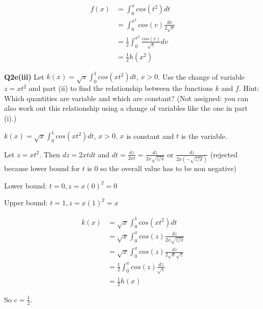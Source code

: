 \documentclass[9pt]{article}
\begin{document}
\begin{align*}
  f(x) &= \int_0^x cos(t^2) dt \\
  &= \int_0^{x^2} cos(v) \frac{dv}{2\sqrt{v}} \\
  &= \frac{1}{2} \int_0^{x^2} \frac{cos(v)}{\sqrt{v}} dv \\
  &= \frac{1}{2} h(x^2)
\end{align*}


\begin{tcolorbox}
  \textbf{Q2e(iii)} Let $k(x) = \sqrt{x} \int_0^1 cos(xt^2)dt$, $x > 0$. Use the change of variable $z = xt^2$ and part (ii) to find the relationship between the functions $k$ and $f$. Hint: Which quantities are variable and which are constant? (Not assigned: you can also work out this relationship using a change of variables like the one in part (i).)
\end{tcolorbox}

$k(x) = \sqrt{x} \int_0^1 cos(xt^2)dt$, $x > 0$. $x$ is constant and $t$ is the variable.

Let $z = xt^2$. Then $dz = 2xt dt$ and $dt = \frac{dz}{2xt} = \frac{dz}{2x\sqrt{z/x}}$ or $\frac{dz}{2x(-\sqrt{z/x})}$ (rejected because lower bound for $t$ is $0$ so the overall value has to be non negative)

Lower bound: $t = 0, z = x(0)^2 = 0$

Upper bound: $t = 1, z = x(1)^2 = x$

\begin{align*}
  k(x) &= \sqrt{x} \int_0^1 cos(xt^2) dt \\
  &= \sqrt{x} \int_0^x cos(z) \frac{dz}{2x\sqrt{z/x}} \\
  &= \sqrt{x} \int_0^x cos(z) \frac{dz}{2\sqrt{x}\sqrt{z}} \\
  &= \frac{1}{2} \int_0^x cos(z) \frac{dz}{\sqrt{z}} \\
  &= \frac{1}{2} h(x)
\end{align*}

So $c = \frac{1}{2}$.
\end{document}
